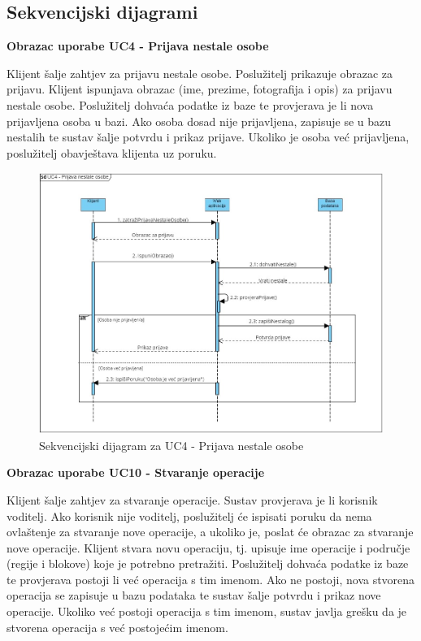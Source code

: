 				\eject		
				
				\subsection{Sekvencijski dijagrami}
				
				\textbf{Obrazac uporabe UC4 - Prijava nestale osobe}
    
                Klijent šalje zahtjev za prijavu nestale osobe. Poslužitelj prikazuje obrazac za prijavu. Klijent ispunjava obrazac (ime, prezime, fotografija i opis) za prijavu nestale osobe. Poslužitelj dohvaća podatke iz baze te provjerava je li nova prijavljena osoba u bazi. Ako osoba dosad nije prijavljena, zapisuje se u bazu nestalih te sustav šalje potvrdu i prikaz prijave. Ukoliko je osoba već prijavljena, poslužitelj obavještava klijenta uz poruku.

                \begin{figure}[H] \includegraphics[width=\linewidth]{./dijagrami/PrijavaNestalog.jpg}
				    \caption{Sekvencijski dijagram za UC4 - Prijava nestale osobe}
				    \end{figure}

                \eject

                \textbf{Obrazac uporabe UC10 - Stvaranje operacije}

                Klijent šalje zahtjev za stvaranje operacije. Sustav provjerava je li korisnik voditelj. Ako korisnik nije voditelj, poslužitelj će ispisati poruku da nema ovlaštenje za stvaranje nove operacije, a ukoliko je, poslat će obrazac za stvaranje nove operacije. Klijent stvara novu operaciju, tj. upisuje ime operacije i područje (regije i blokove) koje je potrebno pretražiti. Poslužitelj dohvaća podatke iz baze te provjerava postoji li već operacija s tim imenom. Ako ne postoji, nova stvorena operacija se zapisuje u bazu podataka te sustav šalje potvrdu i prikaz nove operacije. Ukoliko  već postoji operacija s tim imenom, sustav javlja grešku da je stvorena operacija s već postojećim imenom.
                
